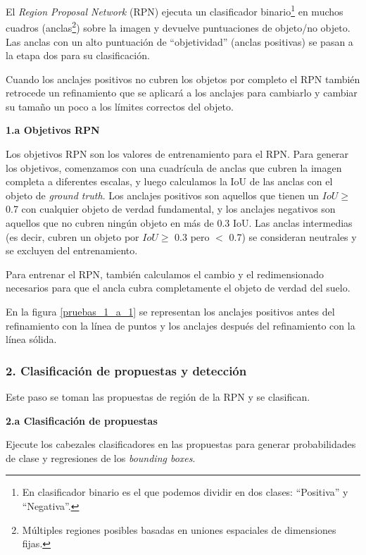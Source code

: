 El \textit{Region Proposal Network} (RPN) ejecuta un clasificador binario\footnote{En clasificador binario es el que podemos dividir en dos clases: “Positiva” y “Negativa”.} en muchos cuadros (anclas\footnote{Múltiples regiones posibles basadas en uniones espaciales de dimensiones fijas.}) sobre la imagen y devuelve puntuaciones de objeto/no objeto. Las anclas con un alto puntuación de ``objetividad'' (anclas positivas) se pasan a la etapa dos para su clasificación.

Cuando los anclajes positivos no cubren los objetos por completo el RPN también retrocede un refinamiento que se aplicará a los anclajes para cambiarlo y cambiar su tamaño un poco a los límites correctos del objeto.

\textbf{1.a Objetivos RPN\label{1_a_Objetivos_RPN}}

Los objetivos RPN son los valores de entrenamiento para el RPN. Para generar los objetivos, comenzamos con una cuadrícula de anclas que cubren la imagen completa a diferentes escalas, y luego calculamos la IoU de las anclas con el objeto de \textit{ground truth}. Los anclajes positivos son aquellos que tienen un \(IoU \geq\) 0.7 con cualquier objeto de verdad fundamental, y los anclajes negativos son aquellos que no cubren ningún objeto en más de 0.3 IoU. Las anclas intermedias (es decir, cubren un objeto por \( IoU \geq\) 0.3 pero \( < \) 0.7) se consideran neutrales y se excluyen del entrenamiento.

Para entrenar el RPN, también calculamos el cambio y el redimensionado necesarios para que el ancla cubra completamente el objeto de verdad del suelo.


En la figura \ref{pruebas_1_a_1} se representan los anclajes positivos antes del refinamiento con la línea de puntos y los anclajes después del refinamiento con la línea sólida.

\subsubsection{2. Clasificación de propuestas y detección\label{2_Clasificación_de_propuestas_y_detección}}

Este paso se toman las propuestas de región de la RPN y se clasifican.

\textbf{2.a Clasificación de propuestas\label{2_a_Clasificación_de_propuestas}}

Ejecute los cabezales clasificadores en las propuestas para generar probabilidades de clase y regresiones de los \textit{bounding boxes}.

